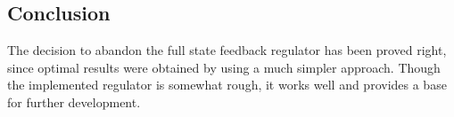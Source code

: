\subsection{Conclusion}
The decision to abandon the full state feedback regulator has been proved right, since optimal results were obtained by using a much simpler approach. Though the implemented regulator is somewhat rough, it works well and provides a base for further development.











